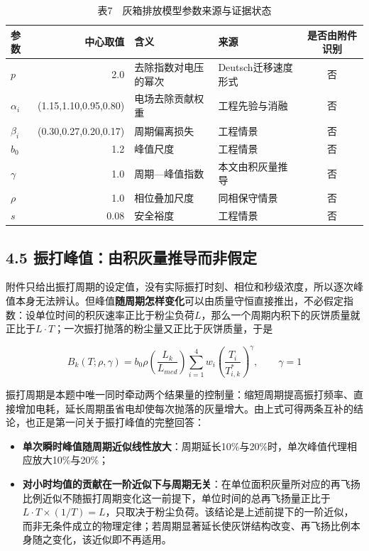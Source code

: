 \documentclass[UTF8,zihao=5,a4paper]{ctexart}
\begin{document}
\begin{table}[htbp]
\centering
\caption*{\normalsize 表7　灰箱排放模型参数来源与证据状态}
\vspace{-2pt}
\begin{tabularx}{\textwidth}{lr>{\hsize=1.013\hsize\raggedright\arraybackslash}X>{\hsize=0.987\hsize\raggedright\arraybackslash}Xc}
\toprule
参数 & 中心取值 & 含义 & 来源 & 是否由附件识别 \\
\midrule
$p$ & 2.0 & 去除指数对电压的幂次 & Deutsch迁移速度形式 & 否 \\
$\alpha_i$ & (1.15,1.10,0.95,0.80) & 电场去除贡献权重 & 工程先验与消融 & 否 \\
$\beta_i$ & (0.30,0.27,0.20,0.17) & 周期偏离损失 & 工程情景 & 否 \\
$b_0$ & 1.2 & 峰值尺度 & 工程情景 & 否 \\
$\gamma$ & 1.0 & 周期—峰值指数 & 本文由积灰量推导 & 否 \\
$\rho$ & 1.0 & 相位叠加尺度 & 同相保守情景 & 否 \\
$s$ & 0.08 & 安全裕度 & 工程情景 & 否 \\
\bottomrule
\end{tabularx}
\end{table}

\subsection*{4.5 振打峰值：由积灰量推导而非假定}

附件只给出振打周期的设定值，没有实际振打时刻、相位和秒级浓度，所以逐次峰值本身无法辨认。但峰值\textbf{随周期怎样变化}可以由质量守恒直接推出，不必假定指数：设单位时间的积灰速率正比于粉尘负荷$L$，那么一个周期内积下的灰饼质量就正比于$L\cdot T$；一次振打抛落的粉尘量又正比于灰饼质量，于是

\begin{equation}
B_k(T;\rho,\gamma)=b_0\rho\left(\frac{L_k}{L_{med}}\right)
\sum_{i=1}^{4}w_i\left(\frac{T_i}{T_{i,k}^*}\right)^{\gamma},\qquad \gamma=1 
\end{equation}

振打周期是本题中唯一同时牵动两个结果量的控制量：缩短周期提高振打频率、直接增加电耗，延长周期虽省电却使每次抛落的灰量增大。由上式可得两条互补的结论，也正是第一问关于振打峰值的完整回答：

\begin{itemize}[itemsep=1pt,topsep=3pt]
\item \textbf{单次瞬时峰值随周期近似线性放大}：周期延长10\%与20\%时，单次峰值代理相应放大10\%与20\%；
\item \textbf{对小时均值的贡献在一阶近似下与周期无关}：在单位面积灰量所对应的再飞扬比例近似不随振打周期变化这一前提下，单位时间的总再飞扬量正比于$L\cdot T\times(1/T)=L$，只取决于粉尘负荷。该结论是上述前提下的一阶近似，而非无条件成立的物理定律；若周期显著延长使灰饼结构改变、再飞扬比例本身随之变化，该近似即不再适用。
\end{itemize}
\end{document}
